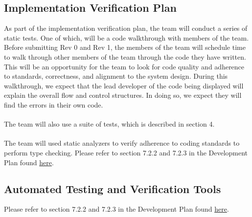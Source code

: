 \documentclass[12pt, titlepage]{article}
\begin{document}


\subsection{Implementation Verification Plan}

As part of the implementation verification plan, the team will conduct a series of static tests. One of which, will be a code walkthrough with members of the team.
Before submitting Rev 0 and Rev 1, the members of the team will schedule time to walk through other members of the team through the code they have written. This will be 
an opportunity for the team to look for code quality and adherence to standards, correctness, and alignment to the system design. During this walkthrough, we expect that 
the lead developer of the code being displayed will explain the overall flow and control structures. In doing so, we expect they will find the errors in their own code.\\\\
The team will also use a suite of tests, which is described in section 4.\\\\
The team will used static analyzers to verify adherence to coding standards to perform type checking. Please refer to section 7.2.2 and 7.2.3 in the Development Plan found \href{https://github.com/OKKM-insights/OKKM.insights/blob/main/docs/DevelopmentPlan/DevelopmentPlan.pdf}{here}.




\subsection{Automated Testing and Verification Tools}

Please refer to section 7.2.2 and 7.2.3 in the Development Plan found \href{https://github.com/OKKM-insights/OKKM.insights/blob/main/docs/DevelopmentPlan/DevelopmentPlan.pdf}{here}.
\end{document}
